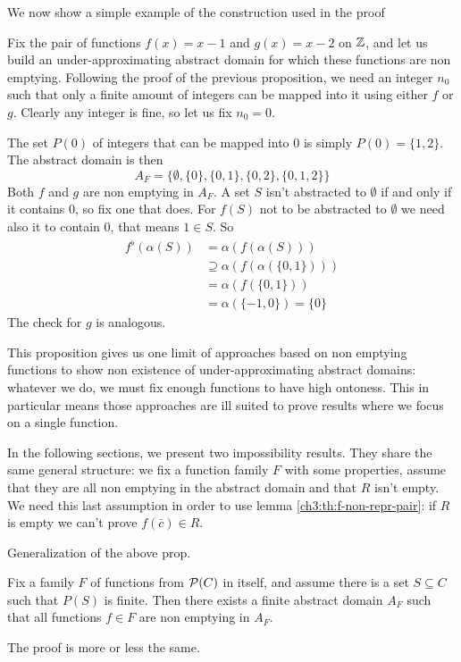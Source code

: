 We now show a simple example of the construction used in the proof
\begin{example}
	Fix the pair of functions $f(x) = x - 1$ and $g(x) = x - 2$ on $\mathbb{Z}$, and let us build an under-approximating abstract domain for which these functions are non emptying. Following the proof of the previous proposition, we need an integer $n_0$ such that only a finite amount of integers can be mapped into it using either $f$ or $g$. Clearly any integer is fine, so let us fix $n_0 = 0$.
	
	The set $P(0)$ of integers that can be mapped into $0$ is simply $P(0) = \{ 1, 2 \}$. The abstract domain is then
	\[
	A_F = \{ \emptyset, \{ 0 \}, \{ 0, 1 \}, \{ 0, 2 \}, \{ 0, 1, 2 \} \}
	\]
	Both $f$ and $g$ are non emptying in $A_F$. A set $S$ isn't abstracted to $\emptyset$ if and only if it contains $0$, so fix one that does.
	For $f(S)$ not to be abstracted to $\emptyset$ we need also it to contain $0$, that means $1 \in S$. So
	\begin{align*}
		f^{\flat}(\alpha(S)) &= \alpha(f(\alpha(S))) \\
		&\supseteq \alpha(f(\alpha(\{ 0, 1 \}))) \\
		&= \alpha(f(\{ 0, 1 \})) \\
		&= \alpha(\{ -1, 0 \}) = \{ 0 \}
	\end{align*}
	The check for $g$ is analogous.
\end{example}

This proposition gives us one limit of approaches based on non emptying functions to show non existence of under-approximating abstract domains: whatever we do, we must fix enough functions to have high ontoness. This in particular means those approaches are ill suited to prove results where we focus on a single function.

In the following sections, we present two impossibility results. They share the same general structure: we fix a function family $F$ with some properties, assume that they are all non emptying in the abstract domain and that $R$ isn't empty. We need this last assumption in order to use lemma \ref{ch3:th:f-non-repr-pair}: if $R$ is empty we can't prove $f(\bar{c}) \in R$.

Generalization of the above prop.
\begin{prop}
	Fix a family $F$ of functions from $\mathcal{P}(C)$ in itself, and assume there is a set $S \subseteq C$ such that $P(S)$ is finite. Then there exists a finite abstract domain $A_F$ such that all functions $f \in F$ are non emptying in $A_F$.
\end{prop}
The proof is more or less the same.

